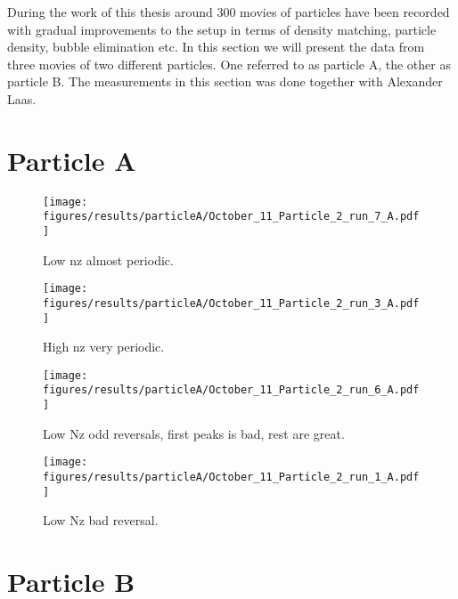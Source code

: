 During the work of this thesis around 300 movies of particles have been recorded with gradual improvements to the setup in terms of density matching, particle density, bubble elimination etc. In this section we will present the data from three movies of two different particles. One referred to as particle A, the other as particle B. The measurements in this section was done together with Alexander Laas.

\section{Particle A}

%

\begin{figure}[H]
\begin{center}
\texttt{[image: figures/results/particleA/October\_11\_Particle\_2\_run\_7\_A.pdf]}
\end{center}
\caption{Low nz almost periodic.}
\label{fig:particleA1}
\end{figure}

\begin{figure}[H]
\begin{center}
\texttt{[image: figures/results/particleA/October\_11\_Particle\_2\_run\_3\_A.pdf]}
\end{center}
\caption{High nz very periodic.}
\label{fig:particleA2}
\end{figure}

\begin{figure}[H]
\begin{center}
\texttt{[image: figures/results/particleA/October\_11\_Particle\_2\_run\_6\_A.pdf]}
\end{center}
\caption{Low Nz odd reversals, first peaks is bad, rest are great.}
\label{fig:particleA3}
\end{figure}

\begin{figure}[H]
\begin{center}
\texttt{[image: figures/results/particleA/October\_11\_Particle\_2\_run\_1\_A.pdf]}
\end{center}
\caption{Low Nz bad reversal.}
\label{fig:particleA4}
\end{figure}

\section{Particle B}

